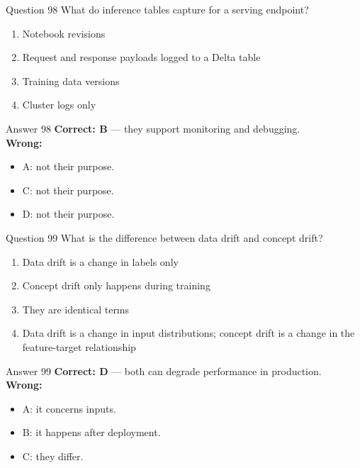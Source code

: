 \documentclass[aspectratio=169,11pt]{beamer}
\begin{document}
	\begin{frame}{Question 98}
		What do inference tables capture for a serving endpoint?
		\begin{enumerate}[label=\Alph*.]
			\item Notebook revisions
			\item Request and response payloads logged to a Delta table
			\item Training data versions
			\item Cluster logs only
		\end{enumerate}
	\end{frame}
	\begin{frame}{Answer 98}
		\textbf{Correct: B} --- they support monitoring and debugging.\\
		\vspace{0.5em}
		\textbf{Wrong:}
		\begin{itemize}
			\item A: not their purpose.
			\item C: not their purpose.
			\item D: not their purpose.
		\end{itemize}
	\end{frame}
	
	\begin{frame}{Question 99}
		What is the difference between data drift and concept drift?
		\begin{enumerate}[label=\Alph*.]
			\item Data drift is a change in labels only
			\item Concept drift only happens during training
			\item They are identical terms
			\item Data drift is a change in input distributions; concept drift is a change in the feature-target relationship
		\end{enumerate}
	\end{frame}
	\begin{frame}{Answer 99}
		\textbf{Correct: D} --- both can degrade performance in production.\\
		\vspace{0.5em}
		\textbf{Wrong:}
		\begin{itemize}
			\item A: it concerns inputs.
			\item B: it happens after deployment.
			\item C: they differ.
		\end{itemize}
	\end{frame}
	
\end{document}

